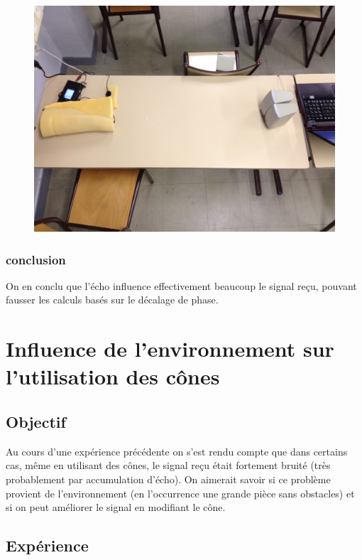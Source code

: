 \documentclass[12pt,a4paper]{report}
\begin{document}
\begin{figure}[H]
\includegraphics[width=\textwidth]{../tests/test_du_protocole/IMG_0924.jpg} 
\end{figure}

\subsection{conclusion}
On en conclu que l'écho influence effectivement beaucoup le signal reçu, pouvant fausser les calculs basés sur le décalage de phase.


\chapter{Influence de l'environnement sur l'utilisation des cônes}
\section{Objectif}
Au cours d'une expérience précédente on s'est rendu compte que dans certains cas, même en utilisant des cônes, le signal reçu était fortement bruité (très probablement par accumulation d'écho). On aimerait savoir si ce problème provient de l'environnement (en l'occurrence une grande pièce sans obstacles) et si on peut améliorer le signal en modifiant le cône.

\section{Expérience}
\end{document}
